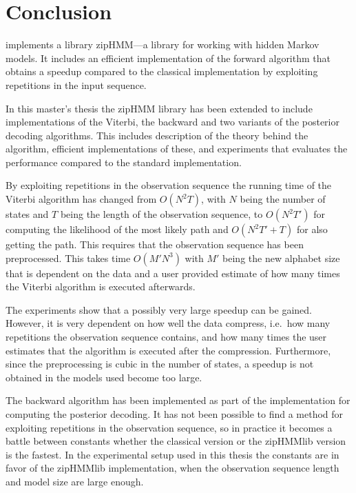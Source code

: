 \chapter{Conclusion}
\label{cha:conclusion}

\citet{sand2013ziphmmlib} implements a library zipHMM---a library for working
with hidden Markov models. It includes an efficient implementation of the forward
algorithm that obtains a speedup compared to the classical implementation by
exploiting repetitions in the input sequence.

In this master's thesis the zipHMM library has been extended to include
implementations of the Viterbi, the backward and two variants of the posterior
decoding algorithms. This includes description of the theory behind the
algorithm, efficient implementations of these, and experiments that evaluates
the performance compared to the standard implementation.

By exploiting repetitions in the observation sequence the running time of the
Viterbi algorithm has changed from $O(N^2 T)$, with $N$ being the number of
states and $T$ being the length of the observation sequence, to $O(N^2 T')$ for
computing the likelihood of the most likely path and $O(N^2 T' + T)$ for also
getting the path. This requires that the observation sequence has been
preprocessed. This takes time $O(M' N^3)$ with $M'$ being the new alphabet size
that is dependent on the data and a user provided estimate of how many times
the Viterbi algorithm is executed afterwards.

The experiments show that a possibly very large speedup can be gained. However,
it is very dependent on how well the data compress, i.e.\ how many repetitions
the observation sequence contains, and how many times the user estimates that the
algorithm is executed after the compression. Furthermore, since the
preprocessing is cubic in the number of states, a speedup is not obtained in
the models used become too large.

The backward algorithm has been implemented as part of the implementation for
computing the posterior decoding. It has not been possible to find a method for
exploiting repetitions in the observation sequence, so in practice it becomes a
battle between constants whether the classical version or the zipHMMlib version
is the fastest. In the experimental setup used in this thesis the constants are
in favor of the zipHMMlib implementation, when the observation sequence length and
model size are large enough.


